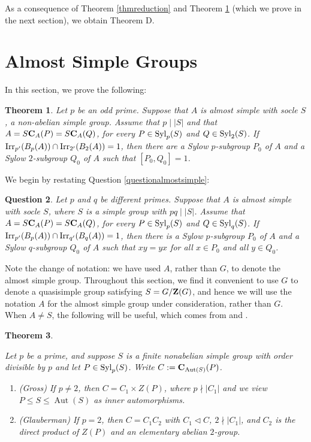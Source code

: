 \documentclass[12pt,leqno,a4paper]{amsart}
\def\syl#1#2{{\rm Syl}_#1(#2)}
\def\zent#1{{\bf Z}(#1)}
\def\cent#1#2{{\bf C}_{#1}(#2)}
\def\irrp#1#2{{\rm Irr}_{#1'}(#2)}
\newtheorem{thm}{Theorem}[section]
\newtheorem{question}[thm]{Question}
\theoremstyle{remark}
\newcommand{\aut}{\operatorname{Aut}}
\begin{document}
As a consequence of Theorem \ref{thmreduction} and Theorem \ref{almostsimple} (which we prove in the
next section),  we obtain Theorem D.




\medskip

\section{Almost Simple Groups}\label{sectionsimples}
In this section, we prove the following: 

\begin{thm}\label{almostsimple}
Let $p$ be an odd prime.
Suppose that
 $A$ is almost simple with socle $S$, a non-abelian simple group. 
 Assume that  $p\mid |S|$ and
 that  $A=S\cent A P=S\cent A Q$, for every $P\in{\rm Syl}_p(S)$ and $Q\in{\rm Syl}_2(S)$.
 If $\irrp{p}{B_p(A)} \cap  \irrp{2}{B_2(A)}=1$,
then there are a Sylow $p$-subgroup $P_0$
of $A$ and a Sylow $2$-subgroup $Q_0$ of $A$ such that $[P_0,Q_0]=1$.
\end{thm}


 We begin by restating Question \ref{questionalmostsimple}:

\begin{question}\label{almostsimpleLie}
Let $p$ and $q$ be different primes.
Suppose that
 $A$ is almost simple with socle $S$, where $S$ is a simple group with $pq\mid |S|$. 
 Assume 
 that  $A=S\cent A P=S\cent A Q$, for every $P\in{\rm Syl}_p(S)$ and $Q\in{\rm Syl}_q(S)$.
 If $\irrp{p}{B_p(A)} \cap  \irrp{q}{B_q(A)}=1$,
then there is a Sylow $p$-subgroup $P_0$
of $A$ and a Sylow $q$-subgroup $Q_0$ of $A$ such that $xy=yx$ for all $x\in P_0$ and all $y\in Q_0$.
\end{question}

Note the change of notation: we have used $A$, rather than $G$, to denote the almost simple group.  Throughout this section, we find it convenient to use $G$ to denote a quasisimple group satisfying $S=G/\zent{G}$, and hence we will use the notation $A$ for the almost simple group under consideration, rather than $G$.
When $A\neq S$, the following will be useful, which comes from \cite[Theorem A]{Gross82} and \cite[Theorem 10]{Glauberman}.
 \begin{thm}\label{A:Sp'}

 Let $p$ be a prime, and suppose $S$ is a finite nonabelian simple group with order divisible by $p$ and let $P\in \syl{p}{S}$. Write $C:=\cent{\aut(S)}{P}$.
 \begin{enumerate}
 \item (Gross) If $p\neq 2$, then $C=C_1\times Z(P)$, where $p\nmid |C_1|$ and we view $P\leq S\leq \aut(S)$ as inner automorphisms. 
 \item (Glauberman) If $p=2$, then $C=C_1C_2$ with $C_1\lhd C$, $2\nmid|C_1|$, and $C_2$ is the direct product of $Z(P)$ and an elementary abelian $2$-group.
 \end{enumerate}
\end{thm}
\end{document}
